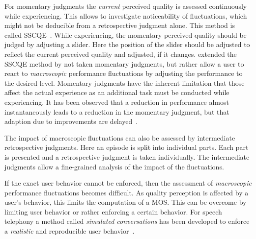 For momentary judgments the \emph{current} perceived quality is assessed continuously while experiencing.
This allows to investigate noticeability of fluctuations, which might not be deducible from a retrospective judgment alone.
This method is called \ac{SSCQE}~\citep[][p.~137]{weiss_temporal_2014}.
While experiencing, the momentary perceived quality should be judged by adjusting a slider.
Here the position of the slider should be adjusted to reflect the current perceived quality and adjusted, if it changes.
\citet{borowiak_long_2013} extended the \ac{SSCQE} method by not taken momentary judgments, but rather allow a user to react to \emph{macroscopic} performance fluctuations by adjusting the performance to the desired level.
Momentary judgments have the inherent limitation that those affect the actual experience as an additional task must be conducted while experiencing.
It has been observed that a reduction in performance almost instantaneously leads to a reduction in the momentary judgment, but that adaption due to improvements are delayed~\cite[\eg,][]{hands_recency_2001, weiss_temporal_2014, hamberg_time-varying_1999}.

The impact of macroscopic fluctuations can also be assessed by intermediate retrospective judgments.
Here an episode is split into individual parts.
Each part is presented and a retrospective judgment is taken individually.
The intermediate judgments allow a fine-grained analysis of the impact of the fluctuations.

If the exact user behavior cannot be enforced, then the assessment of \emph{macroscopic} performance fluctuations becomes difficult.
As quality perception is affected by a user's behavior, this limits the computation of a \ac{MOS}. %
This can be overcome by limiting user behavior or rather enforcing a certain behavior.
For speech telephony a method called \emph{simulated conversations} has been developed to enforce a \emph{realistic} and reproducible user behavior~\citep{berger_estimation_2008}.

